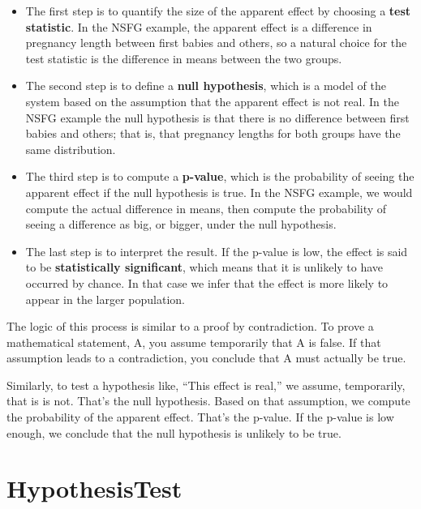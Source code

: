 \documentclass[12pt]{book}
\begin{document}
\begin{itemize}

\item The first step is to quantify the size of the apparent effect by
  choosing a {\bf test statistic}.  In the NSFG example, the apparent
  effect is a difference in pregnancy length between first babies and
  others, so a natural choice for the test statistic is the difference
  in means between the two groups.

\item The second step is to define a {\bf null hypothesis}, which is a
  model of the system based on the assumption that the apparent effect
  is not real.  In the NSFG example the null hypothesis is that there
  is no difference between first babies and others; that is, that
  pregnancy lengths for both groups have the same distribution.

\item The third step is to compute a {\bf p-value}, which is the
  probability of seeing the apparent effect if the null hypothesis is
  true.  In the NSFG example, we would compute the actual difference
  in means, then compute the probability of seeing a
  difference as big, or bigger, under the null hypothesis.

\item The last step is to interpret the result.  If the p-value is
  low, the effect is said to be {\bf statistically significant}, which
  means that it is unlikely to have occurred by chance.  In that case
  we infer that the effect is more likely to appear in the larger
  population.   

\end{itemize}

The logic of this process is similar to a proof by
contradiction.  To prove a mathematical statement, A, you assume
temporarily that A is false.  If that assumption leads to a
contradiction, you conclude that A must actually be true.

Similarly, to test a hypothesis like, ``This effect is real,'' we
assume, temporarily, that is is not.  That's the null hypothesis.
Based on that assumption, we compute the probability of the apparent
effect.  That's the p-value.  If the p-value is low enough, we
conclude that the null hypothesis is unlikely to be true.


\section{HypothesisTest}
\end{document}

